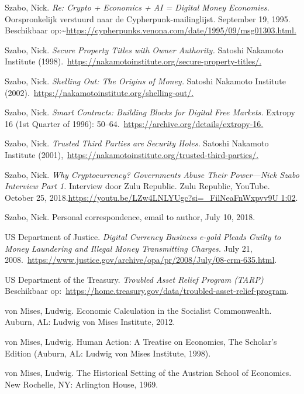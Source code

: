 \documentclass[smalldemyvopaper,11pt,twoside,onecolumn,openright,extrafontsizes,hidelinks]{memoir}
\begin{document}
Szabo, Nick. \emph{Re: Crypto + Economics + AI = Digital Money
Economies.} Oorspronkelijk verstuurd naar de Cypherpunk-mailinglijst.
September 19, 1995. Beschikbaar
op:\textasciitilde{}\href{https://cypherpunks.venona.com/date/1995/09/msg01303.html}{https://cypherpunks.venona.com/date/1995/09/msg01303.html.}

Szabo, Nick. \emph{Secure Property Titles with Owner Authority.} Satoshi
Nakamoto Institute
(1998).~\href{https://nakamotoinstitute.org/secure-property-titles/}{https://nakamotoinstitute.org/secure-property-titles/.}

Szabo, Nick. \emph{Shelling Out: The Origins of Money.} Satoshi Nakamoto
Institute
(2002).~\href{https://nakamotoinstitute.org/shelling-out/}{https://nakamotoinstitute.org/shelling-out/.}

Szabo, Nick. \emph{Smart Contracts: Building Blocks for Digital Free
Markets.} Extropy 16 (1st Quarter of 1996):
50--64.~\url{https://archive.org/details/extropy-16.}

Szabo, Nick. \emph{Trusted Third Parties are Security Holes.} Satoshi
Nakamoto Institute
(2001),~\href{https://nakamotoinstitute.org/trusted-third-parties/}{https://nakamotoinstitute.org/trusted-third-parties/.}

Szabo, Nick. \emph{Why Cryptocurrency? Governments Abuse Their
Power---Nick Szabo Interview Part 1.} Interview door Zulu Republic. Zulu
Republic, YouTube. October 25,
2018.\href{https://youtu.be/LZw4LNLYUgc?si=_FilNeaFnWxpvv9U\%201:02}{https://youtu.be/LZw4LNLYUgc?si=\_FilNeaFnWxpvv9U
1:02}.

Szabo, Nick. Personal correspondence, email to author, July 10, 2018.

US Department of Justice. \emph{Digital Currency Business e-gold Pleads
Guilty to Money Laundering and Illegal Money Transmitting Charges.} July
21,
2008.~\url{https://www.justice.gov/archive/opa/pr/2008/July/08-crm-635.html}.

US Department of the Treasury. \emph{Troubled Asset Relief Program
(TARP)} Beschikbaar
op:~\url{https://home.treasury.gov/data/troubled-asset-relief-program}.

von Mises, Ludwig. Economic Calculation in the Socialist Commonwealth.
Auburn, AL: Ludwig von Mises Institute, 2012.

von Mises, Ludwig. Human Action: A Treatise on Economics, The Scholar's
Edition (Auburn, AL: Ludwig von Mises Institute, 1998).

von Mises, Ludwig. The Historical Setting of the Austrian School of
Economics. New Rochelle, NY: Arlington House, 1969.
\end{document}
